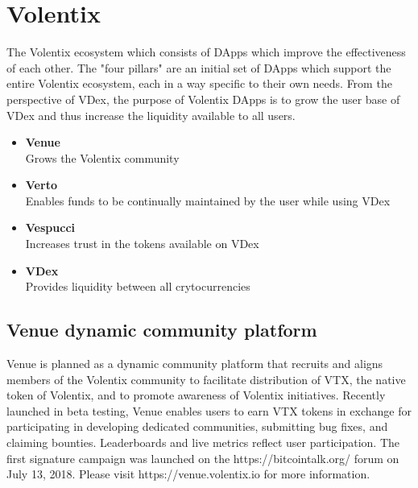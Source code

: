 \documentclass[]{article}
\begin{document}
{\section{Volentix}	
The Volentix ecosystem which consists of DApps which improve the effectiveness of each other.
The "four pillars" are an initial set of DApps which support the entire Volentix ecosystem,
each in a way specific to their own needs.
From the perspective of VDex, the purpose of Volentix DApps is to grow the user base of VDex
and thus increase the liquidity available to all users.\\
\begin{itemize}
\item \textbf{Venue}\\ Grows the Volentix community
\item \textbf{Verto}\\ Enables funds to be continually maintained by the user while using VDex
\item \textbf{Vespucci}\\ Increases trust in the tokens available on VDex
\item \textbf{VDex}\\ Provides liquidity between all crytocurrencies
\end{itemize}

\subsection {Venue dynamic community platform}

Venue is planned as a dynamic community platform that recruits and aligns members of the Volentix community to facilitate distribution of VTX, the native token of Volentix, and to promote awareness of Volentix initiatives. 
Recently launched in beta testing, Venue enables users to earn VTX tokens in exchange for participating in developing dedicated communities, submitting bug fixes, and claiming bounties. Leaderboards and live metrics reflect user participation. The first signature campaign was launched on the https://bitcointalk.org/ forum on July 13, 2018. Please visit https://venue.volentix.io for more information.

	
\begin{figure}
	\centering
	\caption{}
	\label{fig:whitebackground-ecosystem02}
\end{figure}



}
\end{document}
